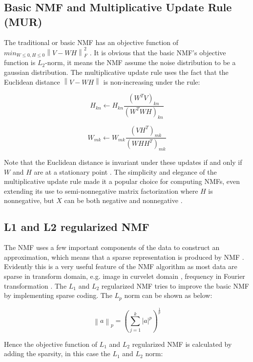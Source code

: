 \documentclass{article} %
\begin{document}
\subsection{Basic NMF and Multiplicative Update Rule (MUR)}
The traditional or basic NMF has an objective function of $min_{W \leq 0, H \leq 0}\left \|V - WH\right \|_F^2$ \cite{source1}. It is obvious that the basic NMF's objective function is $L_2$-norm, it means the NMF assume the noise distribution to be a gaussian distribution. The multiplicative update rule uses the fact that the Euclidean distance $\left \|V - WH\right \|$ is non-increasing under the rule:

\begin{equation}
H_{kn} \leftarrow H_{kn} \frac{\left(W^T V\right)_{kn}}{\left(W^T WH\right)_{kn}}
\end{equation}

\begin{equation}
W_{mk} \leftarrow W_{mk} \frac{\left(V H^T\right)_{mk}}{\left(WH H^T\right)_{mk}}
\end{equation}

Note that the Euclidean distance is invariant under these updates if and only if $W$ and $H$ are at a stationary point \cite{source2}. The simplicity and elegance of the multiplicative update rule made it a popular choice for computing NMFs, even extending its use to semi-nonnegative matrix factorization where $H$ is nonnegative, but $X$ can be both negative and nonnegative \cite{source3}.

\subsection{L1 and L2 regularized NMF}
The NMF uses a few important components of the data to construct an approximation, which means that a sparse representation is produced by NMF \cite{source4}. Evidently this is a very useful feature of the NMF algorithm as most data are sparse in transform domain, e.g. image in curvelet domain \cite{source5}, frequency in Fourier transformation \cite{source6}. The $L_1$ and $L_2$ regularized NMF tries to improve the basic NMF by implementing sparse coding. The $L_p$ norm can be shown as below:

\begin{equation}
\left \| a \right \|_p = \left ( \sum_{j=1}^{k} \left | a \right | ^p \right ) ^{\frac{1}{p}}
\end{equation}

Hence the objective function of $L_1$ and $L_2$ regularized NMF is calculated by adding the sparsity, in this case the $L_1$ and $L_2$ norm:
\end{document}

